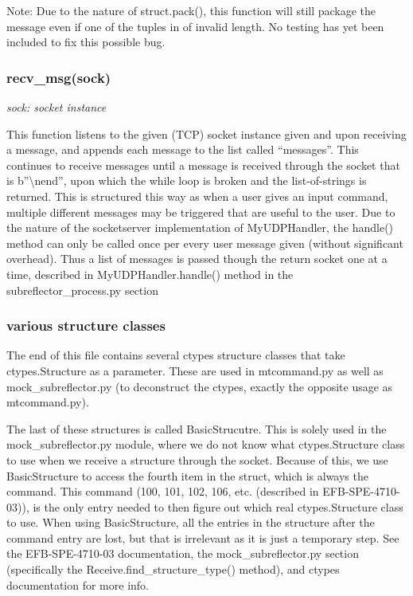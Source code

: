 \documentclass{article}
\begin{document}
Note: Due to the nature of struct.pack(), this function will still package the message even if one of the tuples in of invalid length. No testing has yet been included to fix this possible bug. 

\subsubsection*{recv\_msg(sock)}
\emph{sock: socket instance}
\vspace{10pt}

This function listens to the given (TCP) socket instance given and upon receiving a message, and appends each message to the list called ``messages''. This continues to receive messages until a message is received through the socket that is b''\textbackslash nend'', upon which the while loop is broken and the list-of-strings is returned. This is structured this way as when a user gives an input command, multiple different messages may be triggered that are useful to the user. Due to the nature of the socketserver implementation of MyUDPHandler, the handle() method can only be called once per every user message given (without significant overhead). Thus a list of messages is passed though the return socket one at a time, described in MyUDPHandler.handle() method in the subreflector\_process.py section


\subsubsection*{various structure classes}
The end of this file contains several ctypes structure classes that take ctypes.Structure as a parameter. These are used in mtcommand.py as well as mock\_subreflector.py (to deconstruct the ctypes, exactly the opposite usage as mtcommand.py). 

\vspace{10pt}

The last of these structures is called BasicStrucutre. This is solely used in the mock\_subreflector.py module, where we do not know what ctypes.Structure class to use when we receive a structure through the socket. Because of this, we use BasicStructure to access the fourth item in the struct, which is always the command. This command  (100, 101, 102, 106, etc. (described in EFB-SPE-4710-03)), is the only entry needed to then figure out which real ctypes.Structure class to use. When using BasicStructure, all the entries in the structure after the command entry are lost, but that is irrelevant as it is just a temporary step. See the EFB-SPE-4710-03 documentation, the mock\_subreflector.py section (specifically the Receive.find\_structure\_type() method), and ctypes documentation for more info.
\end{document}
